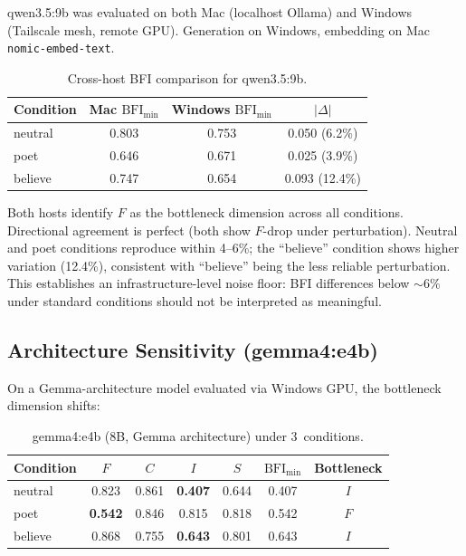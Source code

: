 \documentclass[11pt,a4paper]{article}
\begin{document}
qwen3.5:9b was evaluated on both Mac (localhost Ollama) and Windows (Tailscale mesh, remote GPU). Generation on Windows, embedding on Mac \texttt{nomic-embed-text}.

\begin{table}[h]
\centering
\caption{Cross-host BFI comparison for qwen3.5:9b.}
\label{tab:crosshost}
\begin{tabular}{lccc}
\toprule
Condition & Mac $\text{BFI}_{\min}$ & Windows $\text{BFI}_{\min}$ & $|\Delta|$ \\
\midrule
neutral & 0.803 & 0.753 & 0.050 (6.2\%) \\
poet    & 0.646 & 0.671 & 0.025 (3.9\%) \\
believe & 0.747 & 0.654 & 0.093 (12.4\%) \\
\bottomrule
\end{tabular}
\end{table}

Both hosts identify $F$ as the bottleneck dimension across all conditions. Directional agreement is perfect (both show $F$-drop under perturbation). Neutral and poet conditions reproduce within 4--6\%; the ``believe'' condition shows higher variation (12.4\%), consistent with ``believe'' being the less reliable perturbation. This establishes an infrastructure-level noise floor: BFI differences below ${\sim}$6\% under standard conditions should not be interpreted as meaningful.

\subsection{Architecture Sensitivity (gemma4:e4b)}

On a Gemma-architecture model evaluated via Windows GPU, the bottleneck dimension shifts:

\begin{table}[h]
\centering
\caption{gemma4:e4b (8B, Gemma architecture) under 3~conditions.}
\label{tab:gemma4}
\begin{tabular}{lcccccc}
\toprule
Condition & $F$ & $C$ & $I$ & $S$ & $\text{BFI}_{\min}$ & Bottleneck \\
\midrule
neutral & 0.823 & 0.861 & \textbf{0.407} & 0.644 & 0.407 & $I$ \\
poet    & \textbf{0.542} & 0.846 & 0.815 & 0.818 & 0.542 & $F$ \\
believe & 0.868 & 0.755 & \textbf{0.643} & 0.801 & 0.643 & $I$ \\
\bottomrule
\end{tabular}
\end{table}
\end{document}
